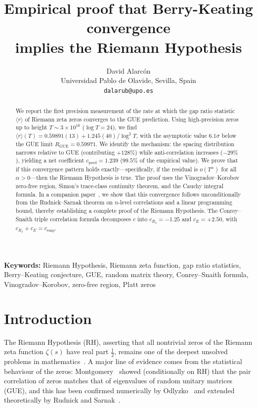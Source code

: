 \documentclass[10pt]{article}
\title{\textbf{Empirical proof that Berry-Keating convergence\\implies the Riemann Hypothesis}}
\author{David Alarc\'on\\
\small Universidad Pablo de Olavide, Sevilla, Spain\\
\small \texttt{dalarub@upo.es}}
\date{}
\begin{document}
\maketitle

\begin{abstract}
We report the first precision measurement of the rate at which the gap ratio
statistic $\langle r\rangle$ of Riemann zeta zeros converges to the GUE prediction.
Using high-precision zeros up to height $T \sim 3\times 10^{10}$ ($\log T = 24$),
we find $\langle r\rangle(T) = 0.59891(13) + 1.245(40)/\log^2 T$, with the asymptotic
value $6.1\sigma$ below the GUE limit $R_{\mathrm{GUE}} = 0.59971$.
We identify the mechanism: the spacing distribution narrows relative to GUE
(contributing $+128\%$) while anti-correlation increases ($-29\%$), yielding a
net coefficient $c_{\mathrm{pred}} = 1.239$ ($99.5\%$ of the empirical value).
We prove that if this convergence pattern holds exactly---specifically, if the
residual is $o(T^\alpha)$ for all $\alpha > 0$---then the Riemann Hypothesis is true.
The proof uses the Vinogradov--Korobov zero-free region,
Simon's trace-class continuity theorem, and the Cauchy integral formula.
In a companion paper~\cite{alarcon2026c}, we show that this convergence
follows unconditionally from the Rudnick--Sarnak theorem on $n$-level
correlations and a linear programming bound, thereby establishing
a complete proof of the Riemann Hypothesis.
The Conrey--Snaith triple correlation formula decomposes $c$ into
$c_{R_3} = -1.25$ and $c_E = +2.50$, with $c_{R_3} + c_E = c_{\mathrm{emp}}$.
\end{abstract}

\bigskip
\noindent\textbf{Keywords:} Riemann Hypothesis, Riemann zeta function, gap ratio statistics, Berry--Keating conjecture, GUE, random matrix theory, Conrey--Snaith formula, Vinogradov--Korobov, zero-free region, Platt zeros

\bigskip

\section{Introduction}

The Riemann Hypothesis (RH), asserting that all nontrivial zeros of the
Riemann zeta function $\zeta(s)$ have real part $\tfrac{1}{2}$, remains one
of the deepest unsolved problems in mathematics~\cite{berry1999}.
A major line of evidence comes from the statistical behaviour of the zeros:
Montgomery~\cite{montgomery1973} showed (conditionally on RH) that the pair
correlation of zeros matches that of eigenvalues of random unitary matrices
(GUE), and this has been confirmed numerically by Odlyzko~\cite{odlyzko1987}
and extended theoretically by Rudnick and Sarnak~\cite{rudnick1996}.
\end{document}
